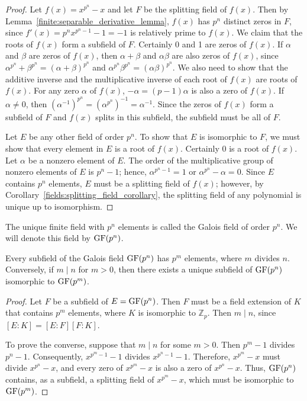 \begin{proof}
Let $f(x) = x^{p^n} - x$ and let $F$ be the splitting field of $f(x)$.  Then by Lemma~\ref{finite:separable_derivative_lemma}, $f(x)$ has $p^n$ distinct zeros in $F$, since $f'(x) = p^n x^{p^n - 1} - 1 = -1$ is relatively prime to $f(x)$.  We claim that the roots of $f(x)$ form a subfield of $F$.  Certainly 0 and 1 are zeros of $f(x)$.  If $\alpha$ and $\beta$ are zeros of $f(x)$, then $\alpha + \beta$ and $\alpha \beta$ are also zeros of $f(x)$, since $\alpha^{p^n} + \beta^{p^n} =  (\alpha + \beta)^{p^n}$ and $\alpha^{p^n} \beta^{p^n} = (\alpha \beta)^{p^n}$. We also need to show that the additive inverse and the multiplicative inverse of each root of $f(x)$ are roots of $f(x)$.  For any zero $\alpha$ of $f(x)$, $-\alpha = (p - 1)\alpha$ is also a zero of $f(x)$. If $\alpha \neq 0$, then $(\alpha^{-1})^{p^n} = (\alpha^{p^n})^{-1} = \alpha^{-1}$. Since the zeros of $f(x)$ form a subfield of $F$ and $f(x)$ splits in this subfield, the subfield must be all of $F$. 

Let $E$ be any other field of order $p^n$.  To show that $E$ is isomorphic to $F$, we must show that every element in $E$ is a root of $f(x)$.  Certainly 0 is a root of $f(x)$.  Let $\alpha$ be a nonzero element of $E$.  The order of the multiplicative group of nonzero elements of $E$ is $p^n-1$; hence, $\alpha^{p^n-1} =1$ or $\alpha^{p^n} -\alpha = 0$.  Since $E$ contains $p^n$ elements, $E$ must be a splitting field of $f(x)$; however, by Corollary~\ref{fields:splitting_field_corollary}, the splitting field of any polynomial is unique up to isomorphism. 
\end{proof}
 
\medskip

The unique finite field with $p^n$ elements is called the {\bfi Galois field\/} of order $p^n$. We will denote this field by $\operatorname{GF}(p^n)$\label{galoisfield}. 

\begin{theorem}\label{finite:subfields_theorem}
Every subfield of the Galois field $\operatorname{GF}(p^n)$ has $p^m$ elements, where $m$ divides $n$.  Conversely, if $m \mid n$ for $m > 0$, then  there exists a unique subfield of $\operatorname{GF}(p^n)$ isomorphic to  $\operatorname{GF}(p^m)$.
\end{theorem}

\begin{proof}
Let $F$ be a subfield of $E = \operatorname{GF}(p^n)$.  Then $F$ must be a field extension of $K$ that contains  $p^m$ elements, where $K$ is isomorphic to ${\mathbb Z}_p$.   Then $m \mid n$, since $[E:K] = [E:F][F:K]$.

To prove the converse, suppose that $m \mid n$ for some $m > 0$.  Then $p^m -1$ divides $p^n -1$. Consequently, $x^{p^m -1} - 1$ divides $x^{p^n -1} -1$. Therefore, $x^{p^m} - x$ must divide $x^{p^n} - x$, and every zero of $x^{p^m} - x$ is also a zero of $x^{p^n} - x$. Thus, $\operatorname{GF}(p^n)$ contains, as a subfield, a splitting field of $x^{p^m} - x$, which must be isomorphic to $\operatorname{GF}(p^m)$.
\end{proof}
     

